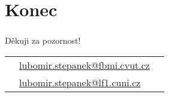\documentclass[t]{beamer}
\begin{document}
\section{Konec}


{
\begin{frame}
\frametitle{}
  \vspace{+2.5cm}
  \begin{block}{\centering Děkuji za pozornost!}
    \center
    \begin{tabular}{l@{}l@{}l}
      &\href{mailto:lubomir.stepanek@fbmi.cvut.cz}{%
        lubomir.stepanek@fbmi.cvut.cz%
      } \\
      &\href{mailto:lubomir.stepanek@lf1.cuni.cz}{%
        lubomir.stepanek@lf1.cuni.cz%
      }
    \end{tabular}
  \end{block}
\end{frame}
}


\end{document}
